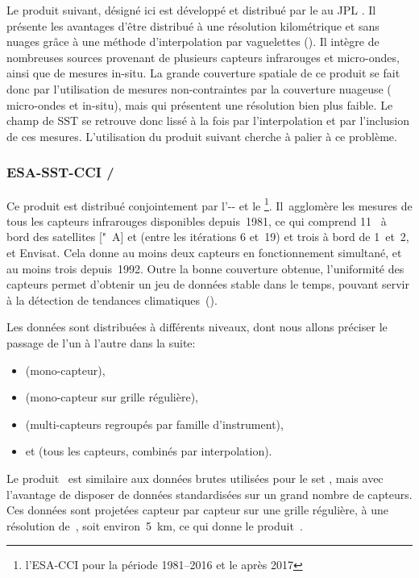 Le produit suivant, désigné ici  est développé et distribué par le  au JPL  .
Il présente les avantages d'être distribué à une résolution kilométrique et sans nuages grâce à une méthode d'interpolation par vaguelettes (\cite{chin_2017}).
Il intègre de nombreuses sources provenant de plusieurs capteurs infrarouges et micro-ondes, ainsi que de mesures in-situ.
La grande couverture spatiale de ce produit se fait donc par l'utilisation de mesures non-contraintes par la couverture nuageuse ( micro-ondes et in-situ), mais qui présentent une résolution bien plus faible.
Le champ de SST se retrouve donc lissé à la fois par l'interpolation et par l'inclusion de ces mesures.
L'utilisation du produit suivant cherche à palier à ce problème.

\subsubsection{ESA-SST-CCI / }

Ce produit est distribué conjointement par l'-- et le \footnote{%
  l'ESA-CCI pour la période 1981--2016 et le  après 2017}.
Il~agglomère les mesures de tous les capteurs infrarouges disponibles depuis~1981, ce qui comprend 11~ à bord des satellites ["~A] et  (entre les itérations 6 et~19) et trois  à bord de  1~et~2, et Envisat. 
Cela donne au moins deux capteurs en fonctionnement simultané, et au moins trois depuis~1992.
Outre la bonne couverture obtenue, l'uniformité des capteurs permet d'obtenir un jeu de données stable dans le temps, pouvant servir à la détection de tendances climatiques~(\cite{merchant_2019}).

Les données sont distribuées à différents niveaux, dont nous allons préciser le passage de l'un à l'autre dans la suite:
\begin{itemize}
  \item {} (mono-capteur),
  \item {} (mono-capteur sur grille régulière),
  \item {} (multi-capteurs regroupés par famille d'instrument),
  \item et  (tous les capteurs, combinés par interpolation).
\end{itemize}

Le produit~ est similaire aux données brutes utilisées pour le set , mais avec l'avantage de disposer de données standardisées sur un grand nombre de capteurs.
Ces données sont projetées capteur par capteur sur une grille régulière, à une résolution de~, soit environ~\qty{5}{\km}, ce qui donne le produit~.

